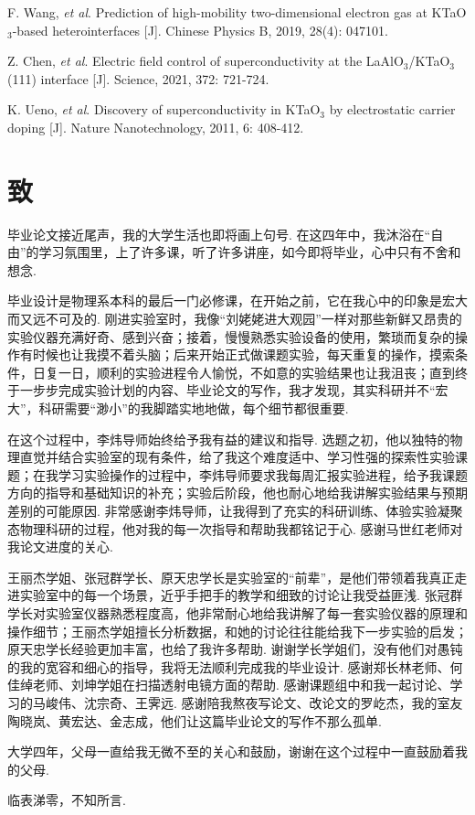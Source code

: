 \documentclass[12pt,a4paper,openany,twoside,UTF-8]{book}
\begin{document}
\begin{thebibliography}{99}
F. Wang, \textit{et al}. Prediction of high-mobility two-dimensional electron gas at KTaO$_3$-based heterointerfaces [J]. Chinese Physics B, 2019, 28(4): 047101.

Z. Chen, \textit{et al}. Electric field control of superconductivity at the LaAlO$_3$/KTaO$_3$ (111) interface [J]. Science, 2021, 372: 721-724.

K. Ueno, \textit{et al}. Discovery of superconductivity in KTaO$_3$ by electrostatic carrier doping [J]. Nature Nanotechnology, 2011, 6: 408-412.



\end{thebibliography}


\newpage
\chapter*{致}

毕业论文接近尾声，我的大学生活也即将画上句号. 在这四年中，我沐浴在“自由”的学习氛围里，上了许多课，听了许多讲座，如今即将毕业，心中只有不舍和想念.

毕业设计是物理系本科的最后一门必修课，在开始之前，它在我心中的印象是宏大而又远不可及的. 刚进实验室时，我像“刘姥姥进大观园”一样对那些新鲜又昂贵的实验仪器充满好奇、感到兴奋；接着，慢慢熟悉实验设备的使用，繁琐而复杂的操作有时候也让我摸不着头脑；后来开始正式做课题实验，每天重复的操作，摸索条件，日复一日，顺利的实验进程令人愉悦，不如意的实验结果也让我沮丧；直到终于一步步完成实验计划的内容、毕业论文的写作，我才发现，其实科研并不“宏大”，科研需要“渺小”的我脚踏实地地做，每个细节都很重要.

在这个过程中，李炜导师始终给予我有益的建议和指导. 选题之初，他以独特的物理直觉并结合实验室的现有条件，给了我这个难度适中、学习性强的探索性实验课题；在我学习实验操作的过程中，李炜导师要求我每周汇报实验进程，给予我课题方向的指导和基础知识的补充；实验后阶段，他也耐心地给我讲解实验结果与预期差别的可能原因. 非常感谢李炜导师，让我得到了充实的科研训练、体验实验凝聚态物理科研的过程，他对我的每一次指导和帮助我都铭记于心. 感谢马世红老师对我论文进度的关心.

王丽杰学姐、张冠群学长、原天忠学长是实验室的“前辈”，是他们带领着我真正走进实验室中的每一个场景，近乎手把手的教学和细致的讨论让我受益匪浅. 张冠群学长对实验室仪器熟悉程度高，他非常耐心地给我讲解了每一套实验仪器的原理和操作细节；王丽杰学姐擅长分析数据，和她的讨论往往能给我下一步实验的启发；原天忠学长经验更加丰富，也给了我许多帮助. 谢谢学长学姐们，没有他们对愚钝的我的宽容和细心的指导，我将无法顺利完成我的毕业设计. 感谢郑长林老师、何佳绰老师、刘坤学姐在扫描透射电镜方面的帮助. 感谢课题组中和我一起讨论、学习的马峻伟、沈宗奇、王霁远. 感谢陪我熬夜写论文、改论文的罗屹杰，我的室友陶晓岚、黄宏达、金志成，他们让这篇毕业论文的写作不那么孤单.

大学四年，父母一直给我无微不至的关心和鼓励，谢谢在这个过程中一直鼓励着我的父母.

临表涕零，不知所言.

\begin{titlepage}	


\end{titlepage}
\end{document}
